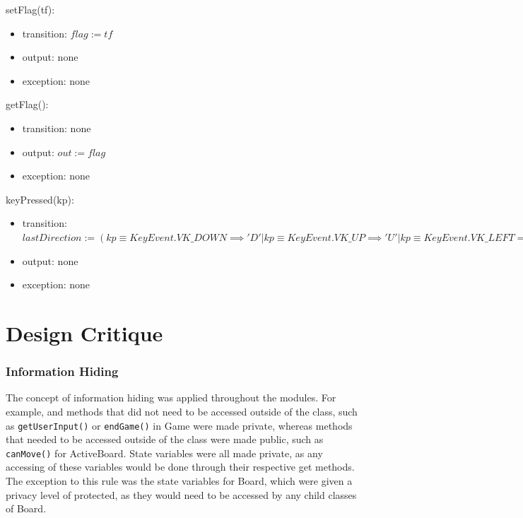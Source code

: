 \documentclass[12pt]{article}
\begin{document}
\noindent setFlag(tf):
\begin{itemize}
\item transition: $flag := tf$
\item output: none
\item exception: none
\end{itemize}

\noindent getFlag():
\begin{itemize}
\item transition: none
\item output: $out := flag$
\item exception: none
\end{itemize}

\noindent keyPressed(kp):
\begin{itemize}
\item transition: $lastDirection := (kp \equiv KeyEvent.VK\_DOWN \implies 'D' |kp \equiv KeyEvent.VK\_UP \implies 'U' | kp \equiv KeyEvent.VK\_LEFT \implies 'L' |kp \equiv KeyEvent.VK\_RIGHT \implies 'R'| kp \equiv KeyEvent.VK\_ESCAPE \implies 'E')$ \\
\item output: none
\item exception: none
\end{itemize}

\newpage

\section*{Design Critique}

\subsubsection*{Information Hiding}
The concept of information hiding was applied throughout the modules. For example, and methods that did not need to be accessed outside of the class, such as \texttt{getUserInput()} or \texttt{endGame()} in Game were made private, whereas methods that needed to be accessed outside of the class were made public, such as \texttt{canMove()} for ActiveBoard. State variables were all made private, as any accessing of these variables would be done through their respective get methods. The exception to this rule was the state variables for Board, which were given a privacy level of protected, as they would need to be accessed by any child classes of Board. 
\end{document}
